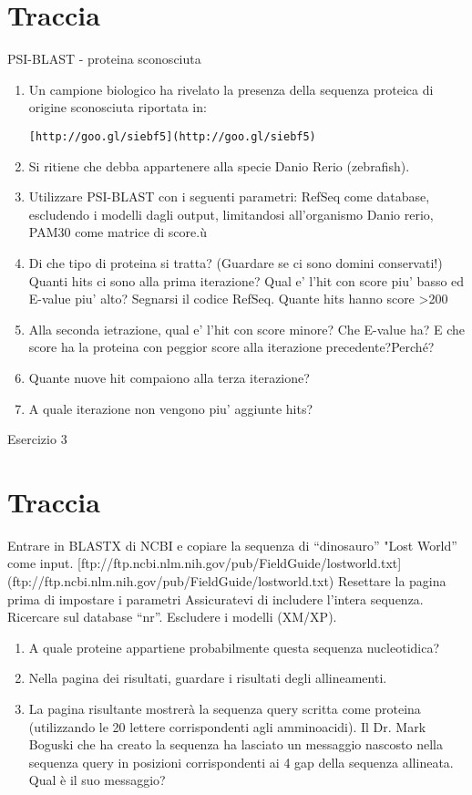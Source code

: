\documentclass{article}
\begin{document}
\section*{Traccia}
PSI-BLAST - proteina sconosciuta
\begin{enumerate}
   \item Un campione biologico ha rivelato la presenza della sequenza proteica di origine sconosciuta riportata in:
   \begin{verbatim}[http://goo.gl/siebf5](http://goo.gl/siebf5)\end{verbatim}
   \item Si ritiene che debba appartenere alla specie Danio Rerio (zebrafish).
   \item Utilizzare PSI-BLAST con i seguenti parametri: RefSeq come database, escludendo i modelli dagli output, limitandosi all'organismo Danio rerio, PAM30 come matrice di score.ù
   \item Di che tipo di proteina si tratta? (Guardare se ci sono domini conservati!) Quanti hits ci sono alla prima iterazione? Qual e' l'hit con score piu' basso ed E-value piu' alto? Segnarsi il codice RefSeq. Quante hits hanno score >200
   \item Alla seconda ietrazione, qual e' l'hit con score minore? Che E-value ha? E che score ha la proteina con peggior score alla iterazione precedente?Perché?
   \item Quante nuove hit compaiono alla terza iterazione?
   \item A quale iterazione non vengono piu' aggiunte hits?
\end{enumerate}

\begin{center}
   \huge
   Esercizio 3
\end{center}
\section*{Traccia}
Entrare in BLASTX di NCBI e copiare la sequenza di “dinosauro” "Lost World” come input.
[ftp://ftp.ncbi.nlm.nih.gov/pub/FieldGuide/lostworld.txt](ftp://ftp.ncbi.nlm.nih.gov/pub/FieldGuide/lostworld.txt)
Resettare la pagina prima di impostare i parametri Assicuratevi di includere l'intera sequenza. Ricercare sul database “nr”. Escludere i modelli (XM/XP).
\begin{enumerate}
   \item A quale proteine appartiene probabilmente questa sequenza nucleotidica?
   \item Nella pagina dei risultati, guardare i risultati degli allineamenti.
   \item La pagina risultante mostrerà la sequenza query scritta come proteina (utilizzando le 20 lettere corrispondenti agli amminoacidi). Il Dr. Mark Boguski che ha creato la sequenza ha lasciato un messaggio nascosto nella sequenza query in posizioni corrispondenti ai 4 gap della sequenza allineata. Qual è il suo messaggio?
\end{enumerate}
\end{document}
